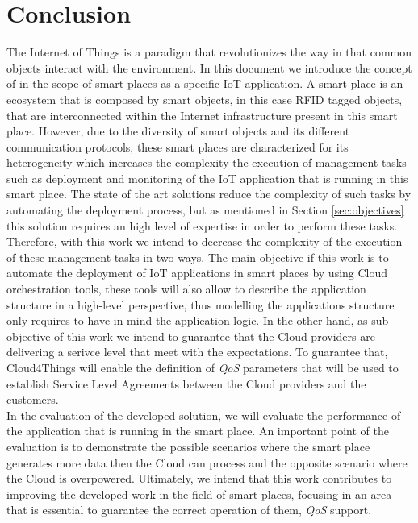 \section{Conclusion}
\label{sec:conclusion}
The Internet of Things is a paradigm that revolutionizes the way in that common objects
interact with the environment. In this document we introduce the concept of in the scope of smart
places as a specific IoT application. A smart place is an ecosystem that is composed by smart objects,
in this case RFID tagged objects, that are interconnected within the Internet infrastructure present
in this smart place. However, due to the diversity of smart objects and its different communication
protocols, these smart places are characterized for its heterogeneity which increases the
complexity the execution of management tasks such as deployment and monitoring of the
IoT application that is running in this smart place. The state of the art solutions
reduce the complexity of such tasks by automating the deployment process, but as mentioned
in Section \ref{sec:objectives} this solution requires an high level of expertise in
order to perform these tasks.\\

Therefore, with this work we intend to decrease the complexity of the execution of these
management tasks in two ways. The main objective if this work is to automate the deployment
of IoT applications in smart places by using Cloud orchestration tools, these tools will also
allow to describe the application structure in a high-level perspective, thus modelling the applications
structure only requires to have in mind the application logic. In the other hand, as sub
objective of this work we intend to guarantee that the Cloud providers are delivering a serivce
level that meet with the expectations. To guarantee that, Cloud4Things will enable the
definition of \textit{QoS} parameters that will be used to establish Service Level Agreements
between the Cloud providers and the customers.\\

In the evaluation of the developed solution, we will evaluate the performance of the application
that is running in the smart place. An important point of the evaluation is to demonstrate the
possible scenarios where the smart place generates more data then the Cloud can process and the
opposite scenario where the Cloud is overpowered. Ultimately, we intend that this work contributes
to improving the developed work in the field of smart places, focusing in an area that is essential
to guarantee the correct operation of them, \textit{QoS} support.
